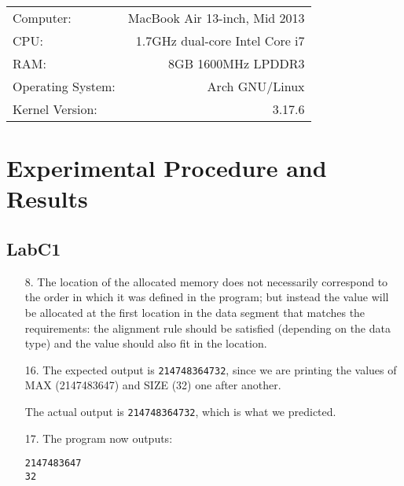 \documentclass{article}
\begin{document}
\begin{center}
\begin{tabular}{l r}
Computer: & MacBook Air 13-inch, Mid 2013 \\
CPU: & 1.7GHz dual-core Intel Core i7 \\
RAM: & 8GB 1600MHz LPDDR3 \\
Operating System: & Arch GNU/Linux \\
Kernel Version: & 3.17.6
\end{tabular}
\end{center}


\section{Experimental Procedure and Results}

\subsection{LabC1}
\begin{enumerate}
\item[8. ] The location of the allocated memory does not necessarily correspond to the order in which it was defined in the program; but instead the value will be allocated at the first location in the data segment that matches the requirements: the alignment rule should be satisfied (depending on the data type) and the value should also fit in the location.

\item[16. ] The expected output is \verb$214748364732$, since we are printing the values of MAX (2147483647) and SIZE (32) one after another.

The actual output is \verb$214748364732$, which is what we predicted.

\item[17. ] The program now outputs:
\begin{verbatim}
2147483647
32
\end{verbatim}


\end{enumerate}
\end{document}
